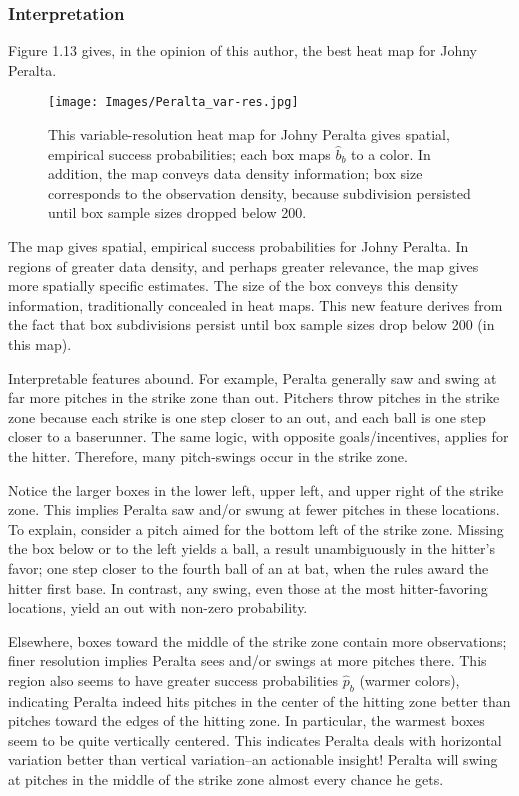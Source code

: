 \subsubsection{Interpretation}
Figure 1.13 gives, in the opinion of this author, the best heat map for Johny Peralta.
        \begin{figure}[H]
      	\centering      
      	\texttt{[image: Images/Peralta\_var-res.jpg]}
      	\caption{This variable-resolution heat map for Johny Peralta gives spatial, empirical success probabilities; each box maps $\hat{b}_{b}$ to a color. In addition, the map conveys data density information; box size corresponds to the observation density, because subdivision persisted until box sample sizes dropped below 200.}
\end{figure}
The map gives spatial, empirical success probabilities for Johny Peralta. In regions of greater data density, and perhaps greater relevance, the map gives more spatially specific estimates. The size of the box conveys this density information, traditionally concealed in heat maps. This new feature derives from the fact that box subdivisions persist until box sample sizes drop below 200 (in this map).

Interpretable features abound. For example, Peralta generally saw and swing at far more pitches in the strike zone than out. Pitchers throw pitches in the strike zone because each strike is one step closer to an out, and each ball is one step closer to a baserunner. The same logic, with opposite goals/incentives, applies for the hitter. Therefore, many pitch-swings occur in the strike zone.

Notice the larger boxes in the lower left, upper left, and upper right of the strike zone. This implies Peralta saw and/or swung at fewer pitches in these locations. To explain, consider a pitch aimed for the bottom left of the strike zone. Missing the box below or to the left yields a ball, a result unambiguously in the hitter's favor; one step closer to the fourth ball of an at bat, when the rules award the hitter first base. In contrast, any swing, even those at the most hitter-favoring locations, yield an out with non-zero probability.

Elsewhere, boxes toward the middle of the strike zone contain more observations; finer resolution implies Peralta sees and/or swings at more pitches there. This region also seems to have greater success probabilities $\hat{p}_{b}$ (warmer colors), indicating Peralta indeed hits pitches in the center of the hitting zone better than pitches toward the edges of the hitting zone. In particular, the warmest boxes seem to be quite vertically centered. This indicates Peralta deals with horizontal variation better than vertical variation--an actionable insight! Peralta will swing at pitches in the middle of the strike zone almost every chance he gets.

